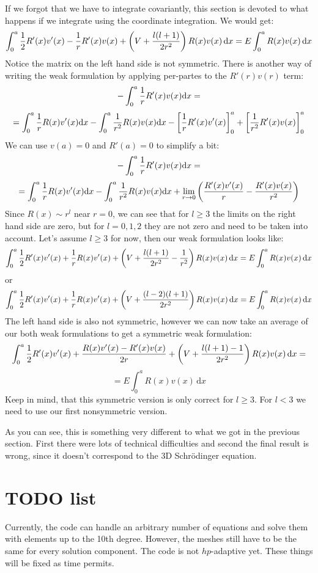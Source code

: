 \documentclass[12pt]{article}
\def\d{\mbox{d}}
\begin{document}
If we forgot that we have to integrate covariantly, this section is devoted
to what happens if we integrate using the coordinate integration. We would get:
$$\int_0^a {1\over2}R'(x)v'(x)-{1\over r}R'(x)v(x)+
\left(V+{l(l+1)\over2r^2}\right)R(x)v(x)\,\d x
=
E\int_0^aR(x)v(x)\,\d x
$$
Notice the matrix on the left hand side is not symmetric. There is another way
of writing the weak formulation by applying per-partes to the $R'(r)v(r)$ term:
$$-\int_0^a{1\over r}R'(x)v(x)\d x=
$$
$$
=\int_0^a{1\over r}R(x)v'(x)\d x
-\int_0^a{1\over r^2}R(x)v(x)\d x
-\left[{1\over r}R'(x)v'(x)\right]_0^a
+\left[{1\over r^2}R'(x)v(x)\right]_0^a
$$
We can use $v(a)=0$ and $R'(a)=0$ to simplify a bit:
$$-\int_0^a{1\over r}R'(x)v(x)\d x=
$$
$$
=\int_0^a{1\over r}R(x)v'(x)\d x
-\int_0^a{1\over r^2}R(x)v(x)\d x
+\lim_{r\to0}\left({R'(x)v'(x)\over r}-{R'(x)v(x)\over r^2}\right)
$$
Since $R(x)\sim r^l$ near $r=0$, we can see that for $l\ge3$ the limits
on the right hand side are zero, but for $l=0, 1, 2$ they are not zero and need
to be taken into account. Let's assume $l\ge3$ for now, then our weak formulation looks like:
$$\int_0^a {1\over2}R'(x)v'(x)+{1\over r}R(x)v'(x)+
\left(V+{l(l+1)\over2r^2}-{1\over r^2}\right)R(x)v(x)\,\d x
=
E\int_0^aR(x)v(x)\,\d x
$$
or
$$\int_0^a {1\over2}R'(x)v'(x)+{1\over r}R(x)v'(x)+
\left(V+{(l-2)(l+1)\over2r^2}\right)R(x)v(x)\,\d x
=
E\int_0^aR(x)v(x)\,\d x
$$
The left hand side is also not symmetric, however we can now take an average of
our both weak formulations to get a symmetric weak formulation:
$$\int_0^a {1\over2}R'(x)v'(x)+{R(x)v'(x)-R'(x)v(x)\over 2r}+
\left(V+{l(l+1)-1\over2r^2}\right)R(x)v(x)\,\d x
=
$$
$$
=
E\int_0^aR(x)v(x)\,\d x
$$
Keep in mind, that this symmetric version is only correct for $l\ge3$. For
$l<3$ we need to use our first nonsymmetric version.

As you can see, this is something very different to what we got in the previous
section. First there were lots of technical difficulties and second the final
result is wrong, since it doesn't correspond to the 3D Schr\"odinger equation.

\section{TODO list}

Currently, the code can handle an arbitrary number of equations and solve them
with elements up to the 10th degree. However, the meshes still have to be the
same for every solution component. The code is not $hp$-adaptive yet. These
things will be fixed as time permits.
\end{document}
